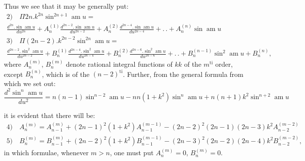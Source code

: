 \documentclass{article}
\begin{document}
Thus we see that it may be generally put:
\[
\begin{gathered}
\text{2)}\quad\Pi 2n.k^{2n}\sin^{2n+1}\operatorname{am}u=\\[1.5ex]
\frac{d^{2n}.\sin\operatorname{am}u}{du^{2n}}+A_{n}^{(1)}\frac{d^{2n-2}.\sin\operatorname{am}u}{du^{2n-2}}+A_{n}^{(2)}\frac{d^{2n-4}.\sin\operatorname{am}u}{du^{2n-4}}+.\,.+A_{n}^{(n)}\sin\operatorname{am}u\\[1.5ex]
\text{3)}\quad\Pi(2n-2).k^{2n-2}\sin^{2n}\operatorname{am}u=\\[1.5ex]
\frac{d^{2n-2}.\sin^{2}\operatorname{am}u}{du^{2n-2}}+B_{n}^{(1)}\frac{d^{2n-4}.\sin^{2}\operatorname{am}u}{du^{2n-4}}+B_{n}^{(2)}\frac{d^{2n-6}.\sin^{2}\operatorname{am}u}{du^{2n-6}}+.\,.+B_{n}^{(n-1)}\sin^{2}\operatorname{am}u+B_{n}^{(n)},
\end{gathered}
\]
where $A_{n}^{(m)}$, $B_{n}^{(m)}$ denote rational integral functions of $kk$ of the $m^{\mathrm{ti}}$ order, except $B_{n}^{(n)}$, which is of the $(n-2)^{\mathrm{ti}}$. Further, from the general formula from which we set out:
\[
\frac{d^{2}\sin^{n}\operatorname{am}u}{du^{2}}=n(n-1)\sin^{n-2}\operatorname{am}u-nn(1+k^{2})\sin^{n}\operatorname{am}u+n(n+1)k^{2}\sin^{n+2}\operatorname{am}u
\]

it is evident that there will be:
\[
\begin{gathered}
\text{4)}\quad A_{n}^{(m)}=A_{n-1}^{(m)}+(2n-1)^{2}(1+k^{2})A_{n-1}^{(m-1)}-(2n-2)^{2}(2n-1)(2n-3)k^{2}A_{n-2}^{(m-2)}\\[1.5ex]
\text{5)}\quad B_{n}^{(m)}=B_{n-1}^{(m)}+(2n-2)^{2}(1+k^{2})B_{n-1}^{(m-1)}-(2n-3)^{2}(2n-2)(2n-4)k^{2}B_{n-2}^{(m-2)},
\end{gathered}
\]
in which formulae, whenever $m>n$, one must put $A_{n}^{(m)}=0$, $B_{n}^{(m)}=0$.
\end{document}
